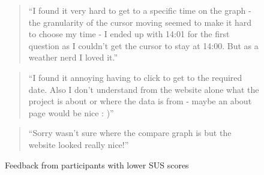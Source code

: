 \begin{figure}[H]
  \centering
  \begin{minipage}{0.9\textwidth}
    \begin{quote}
    ``I found it very hard to get to a specific time on the graph - the
    granularity of the cursor moving seemed to make it hard to choose my time -
    I ended up with 14:01 for the first question as I couldn't get the cursor to
    stay at 14:00. But as a weather nerd I loved it.''
    \end{quote}
 \vspace{8pt}
    \begin{quote}
    ``I found it annoying having to click to get to the required date. Also I
    don't understand from the website alone what the project is about or where
    the data is from - maybe an about page would be nice : )''
    \end{quote}
 \vspace{8pt}
    \begin{quote}
    ``Sorry wasn’t sure where the compare graph is but the website looked really
    nice!''
    \end{quote}
  \end{minipage}
  \caption{Feedback from participants with lower SUS scores}
  \label{fig:low-sus-feedback}
\end{figure}

